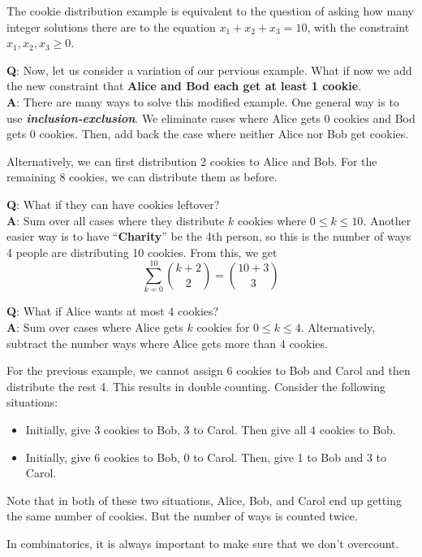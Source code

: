The cookie distribution example is equivalent to the question of asking how many integer solutions there are to the equation $x_1 + x_2 + x_3 = 10$, with the constraint $x_1,x_2,x_3 \geq 0$.

\textbf{Q}: Now, let us consider a variation of our pervious example. What if now we add the new constraint that \textbf{Alice and Bod each get at least 1 cookie}. \\
\textbf{A}: There are many ways to solve this modified example. One general way is to use \textit{\textbf{inclusion-exclusion}}. We eliminate cases where Alice gets 0 cookies and Bod gets 0 cookies. Then, add back the case where neither Alice nor Bob get cookies.

Alternatively, we can first distribution 2 cookies to Alice and Bob. For the remaining 8 cookies, we can distribute them as before.

\textbf{Q}: What if they can have cookies leftover? \\
\textbf{A}: Sum over all cases where they distribute $k$ cookies where $0 \leq k \leq 10$. Another easier way is to have ``\textbf{Charity}'' be the 4th person, so this is the number of ways 4 people are distributing 10 cookies. From this, we get
$$
\sum_{k=0}^{10} \binom{k+2}{2} = \binom{10 + 3}{3}
$$

\textbf{Q}: What if Alice wants at most 4 cookies? \\
\textbf{A}: Sum over cases where Alice gets $k$ cookies for $0 \leq k \leq 4$. Alternatively, subtract the number ways where Alice gets more than 4 cookies.

\begin{remark}
    For the previous example, we cannot assign 6 cookies to Bob and Carol and then distribute the rest 4. This results in double counting. Consider the following situations:
    \begin{itemize}
        \item Initially, give 3 cookies to Bob, 3 to Carol. Then give all 4 cookies to Bob.
        \item Initially, give 6 cookies to Bob, 0 to Carol. Then, give 1 to Bob and 3 to Carol.
    \end{itemize}
    Note that in both of these two situations, Alice, Bob, and Carol end up getting the same number of cookies. But the number of ways is counted twice.

    In combinatorics, it is always important to make sure that we don't overcount.
\end{remark}

